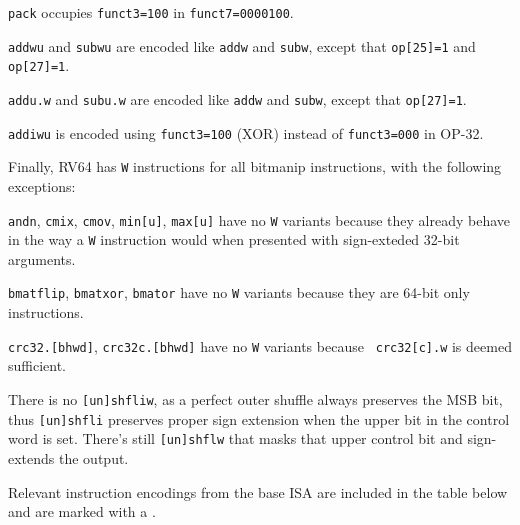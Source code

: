 {\tt pack} occupies {\tt funct3=100} in {\tt funct7=0000100}.

{\tt addwu} and {\tt subwu} are encoded like {\tt addw} and {\tt subw}, except
that {\tt op[25]=1} and {\tt op[27]=1}.

{\tt addu.w} and {\tt subu.w} are encoded like {\tt addw} and {\tt subw}, except
that {\tt op[27]=1}.

{\tt addiwu} is encoded using {\tt funct3=100} (XOR) instead of {\tt funct3=000} in OP-32.

Finally, RV64 has {\tt *W} instructions for all bitmanip instructions, with the
following exceptions:

{\tt andn}, {\tt cmix}, {\tt cmov}, {\tt min[u]}, {\tt max[u]} have no {\tt *W}
variants because they already behave in the way a {\tt *W} instruction would
when presented with sign-exteded 32-bit arguments.

{\tt bmatflip}, {\tt bmatxor}, {\tt bmator} have no {\tt *W} variants because
they are 64-bit only instructions.

{\tt crc32.[bhwd]}, {\tt crc32c.[bhwd]} have no {\tt *W} variants because {\tt
crc32[c].w} is deemed sufficient.

There is no {\tt [un]shfliw}, as a perfect outer shuffle always preserves the
MSB bit, thus {\tt [un]shfli} preserves proper sign extension when the
upper bit in the control word is set. There's still {\tt [un]shflw} that
masks that upper control bit and sign-extends the output.

Relevant instruction encodings from the base ISA are included in the table below
and are marked with a {\tt *}.



